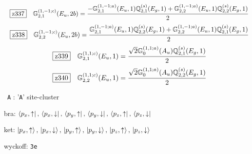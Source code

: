 \documentclass[fleqn,10pt,landscape]{jsarticle}
\begin{document}
\begin{dmath*}
\hspace*{3mm}\fbox{z337}\quad \mathbb{G}_{2,1}^{(1,-1;c)}(E_{u},2b)=\frac{- \mathbb{G}_{2,1}^{(1,-1;a)}(E_{u},1) \mathbb{Q}_{2,1}^{(s)}(E_{g},1) + \mathbb{G}_{2,2}^{(1,-1;a)}(E_{u},1) \mathbb{Q}_{2,2}^{(s)}(E_{g},1)}{2}
\end{dmath*}
\begin{dmath*}
\hspace*{3mm}\fbox{z338}\quad \mathbb{G}_{2,2}^{(1,-1;c)}(E_{u},2b)=\frac{\mathbb{G}_{2,1}^{(1,-1;a)}(E_{u},1) \mathbb{Q}_{2,2}^{(s)}(E_{g},1) + \mathbb{G}_{2,2}^{(1,-1;a)}(E_{u},1) \mathbb{Q}_{2,1}^{(s)}(E_{g},1)}{2}
\end{dmath*}
\begin{dmath*}
\hspace*{3mm}\fbox{z339}\quad \mathbb{G}_{2,1}^{(1,1;c)}(E_{u},1)=\frac{\sqrt{2} \mathbb{G}_{0}^{(1,1;a)}(A_{u}) \mathbb{Q}_{2,1}^{(s)}(E_{g},1)}{2}
\end{dmath*}
\begin{dmath*}
\hspace*{3mm}\fbox{z340}\quad \mathbb{G}_{2,2}^{(1,1;c)}(E_{u},1)=\frac{\sqrt{2} \mathbb{G}_{0}^{(1,1;a)}(A_{u}) \mathbb{Q}_{2,2}^{(s)}(E_{g},1)}{2}
\end{dmath*}
\vspace{5mm}

\noindent\textbullet\, \texttt{A} : '\texttt{A}' site-cluster

\noindent\quad * bra: $\bra{p_{x},\uparrow},\, \bra{p_{x},\downarrow},\, \bra{p_{y},\uparrow},\, \bra{p_{y},\downarrow},\, \bra{p_{z},\uparrow},\, \bra{p_{z},\downarrow}$

\noindent\quad * ket: $\ket{p_{x},\uparrow},\, \ket{p_{x},\downarrow},\, \ket{p_{y},\uparrow},\, \ket{p_{y},\downarrow},\, \ket{p_{z},\uparrow},\, \ket{p_{z},\downarrow}$

\noindent\quad * wyckoff: \texttt{3e}
\end{document}
